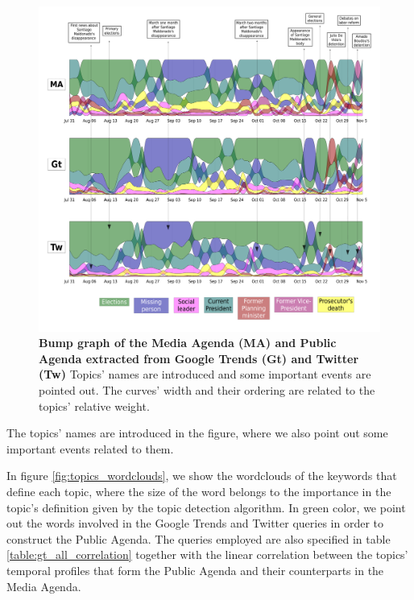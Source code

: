 \begin{figure}[h]
\includegraphics[width = \textwidth]{images/Fig1.pdf}
\caption{\textbf{Bump graph of the Media Agenda (MA) and Public Agenda extracted from Google Trends (Gt) and Twitter (Tw)} Topics’ names are introduced and some important events are pointed out. The curves’ width and their ordering are related to the topics’ relative weight.}
\label{fig:all_agenda}
\end{figure}
 
The topics' names are introduced in the figure, where we also point out some important events related to them.
\par In figure \ref{fig:topics_wordclouds}, we show the wordclouds of the keywords that define each topic, where the size of the word belongs to the importance in the topic's definition given by the topic detection algorithm. In green color, we point out the words involved in the Google Trends and Twitter queries in order to construct the Public Agenda. The queries employed are also specified in table \ref{table:gt_all_correlation} together with the linear correlation between the topics' temporal profiles that form the Public Agenda and their counterparts in the Media Agenda.

